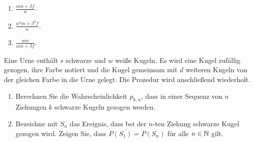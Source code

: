 \solution
\begin{enumerate}
    \item $\frac{\alpha m + \beta f}{n}$.
    \item $\frac{\alpha^2 m + \beta^2 f}{n}$.
    \item $\frac{\alpha m}{\alpha m + \beta f}$.
\end{enumerate}



 Eine Urne
enthält $s$ schwarze und $w$ weiße Kugeln. Es wird eine Kugel zufällig gezogen,
ihre Farbe notiert und die Kugel gemeinsam mit $d$ weiteren Kugeln von der
gleichen Farbe in die Urne gelegt. Die Prozedur wird anschließend wiederholt.
\begin{enumerate}
    \item Berechnen Sie die Wahrscheinlichkeit $p_{k,n}$, dass in einer Sequenz von $n$
        Ziehungen $k$ schwarze Kugeln gezogen werden.
    \item Bezeichne mit $S_n$ das Ereignis, dass bei der $n$-ten Ziehung
        schwarze Kugel gezogen wird. Zeigen Sie, dass $P(S_1)=P(S_n)$ für alle
        $n\in\mathbb N$ gilt.
\end{enumerate}

